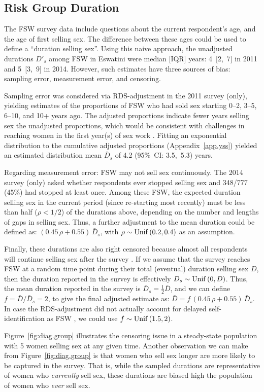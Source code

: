 \subsection{Risk Group Duration}\label{meth.yss}
The FSW survey data include questions about
the current respondent's age, and the age of first selling sex.
The difference between these ages could be used to define a ``duration selling sex''.
Using this naive approach, the unadjusted durations $D'_s$ among FSW in Eswatini were
median [IQR] years: 4~[2,~7] in 2011 and 5~[3,~9] in 2014.
However, such estimates have three sources of bias:
sampling error, measurement error, and censoring.
\par
Sampling error was considered via RDS-adjustment in the 2011 survey (only),
yielding estimates of the proportions of FSW
who had sold sex starting 0--2, 3--5, 6--10, and 10+ years ago.
The adjusted proportions indicate fewer years selling sex \vs the unadjusted proportions,
which would be consistent with
challenges in reaching women in the first year(s) of sex work \cite{Cheuk2020}.
Fitting an exponential distribution to the cumulative adjusted proportions
(Appendix~\ref{app.yss})
yielded an estimated distribution mean $\bar{D}_s$ of 4.2 (95\%~CI: 3.5,~5.3) years.
\par
Regarding measurement error: FSW may not sell sex continuously.
The 2014 survey (only) asked whether respondents ever stopped selling sex
and 348/777 (45\%) had stopped at least once.
Among these FSW, the expected duration selling sex in the current period
(\ie since re-starting most recently)
must be less than half ($\rho < 1/2$) of the durations above,
depending on the number and lengths of gaps in selling sex.
Thus, a further adjustment to the mean duration could be defined as:
$(0.45\,\rho + 0.55)\,\bar{D}_s$,
with $\rho \sim \mathrm{Unif}\,(0.2,0.4)$ as an assumption.
\par
Finally, these durations are also right censored
because almost all respondents will continue selling sex after the survey \cite{Fazito2012}.
If we assume that the survey reaches FSW
at a random time point during their total (eventual) duration selling sex $D$,
then the duration reported in the survey is effectively $D_s \sim \mathrm{Unif}\,(0,D)$.
Thus, the mean duration reported in the survey is $\bar{D}_s = \frac12 \bar{D}$,
and we can define $f = \bar{D} / \bar{D}_s = 2$,
to give the final adjusted estimate as:
$\bar{D} = f\,(0.45\,\rho + 0.55)\,\bar{D}_s$.
In case the RDS-adjustment did not actually account for
delayed self-identification as FSW \cite{Cheuk2020},
we could use $f \sim \mathrm{Unif}\,(1.5,2)$.
\par
Figure~\ref{fig:diag.group} illustrates the censoring issue
in a steady-state population with 5 women selling sex at any given time.
Another observation we can make from Figure~\ref{fig:diag.group} is that
women who sell sex longer are more likely to be captured in the survey.
That is, while the sampled durations are representative of women who \emph{currently} sell sex,
these durations are biased high \vs the population of women who \emph{ever} sell sex.
